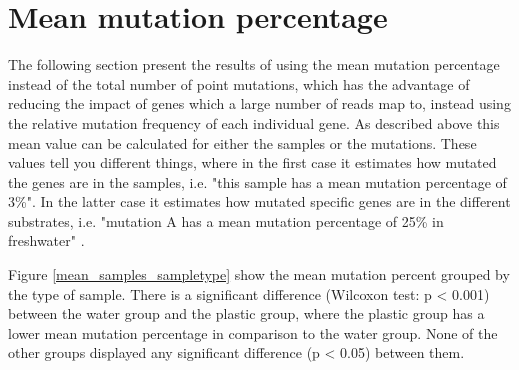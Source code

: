 \section{Mean mutation percentage}
The following section present the results of using the mean mutation percentage instead of the total number of point mutations, which has the advantage of reducing the impact of genes which a large number of reads map to, instead using the relative mutation frequency of each individual gene.
As described above this mean value can be calculated for either the samples or the mutations. These values tell you different things, where in the first case it estimates how mutated the genes are in the samples, i.e. "this sample has a mean mutation percentage of 3\%".
In the latter case it estimates how mutated specific genes are in the different substrates, i.e. "mutation A has a mean mutation percentage of 25\% in freshwater" .

Figure \ref{mean_samples_sampletype} show the mean mutation percent grouped by the type of sample.
There is a significant difference (Wilcoxon test: p < 0.001) between the water group and the plastic group, where the plastic group has a lower mean mutation percentage in comparison to the water group. None of the other groups displayed any significant difference (p < 0.05) between them.


